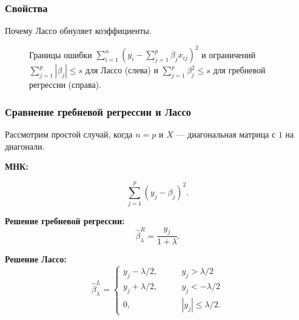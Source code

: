 \documentclass[unicode, notheorems]{beamer}
\begin{document}
\begin{frame}
\frametitle{Свойства}
Почему Лассо обнуляет коэффициенты.

\begin{figure}
\caption{Границы ошибки $\sum_{i=1}^n(y_i - \sum_{j=1}^p \beta_j x_{ij})^2$ и ограничений  $\sum_{j = 1}^p |\beta_j| \leq s$ для Лассо (слева) и $\sum_{j = 1}^p \beta_j^2 \leq s$ для гребневой регрессии (справа).}
\end{figure}

\end{frame}


\begin{frame}
\frametitle{Сравнение гребневой регрессии и Лассо}
Рассмотрим простой случай, когда $n = p$ и $X$ --- диагональная матрица с $1$ на диагонали.

\textbf{МНК:}

\[\sum_{j =1}^p (y_j - \beta_j)^2.\]

\textbf{Решение гребневой регрессии:}
\[\hat{\beta}_{\lambda}^R = \frac{y_j}{1 + \lambda}.\]

\textbf{Решение Лассо:}
\begin{equation*}
\hat{\beta}_{\lambda}^L = 
 \begin{cases}
   y_j - \lambda/2, & \qquad y_j > \lambda/2\\
   y_j + \lambda/2, & \qquad y_j < -\lambda/2 \\
   0, & \qquad |y_j| \leq \lambda/2.
 \end{cases}
\end{equation*}



\end{frame}
\end{document}
